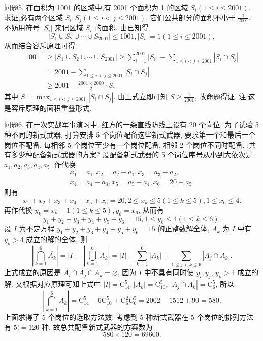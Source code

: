 问题5. 在面积为 1001 的区域中,有 2001 个面积为 1 的区域 $S_i(1 \leqslant i \leqslant 2001)$. 求证,必有两个区域 $S_i, S_j(1 \leqslant i<j \leqslant 2001)$, 它们公共部分的面积不小于 $\frac{1}{2001}$.
不妨用符号 $\left|S_i\right|$ 来记区域 $S_i$ 的面积.
由已知得
$$
\left|S_1 \cup S_2 \cup \cdots \cup S_{2001}\right| \leqslant 1001,\left|S_i\right|=1(1 \leqslant i \leqslant 2001),
$$
从而结合容斥原理可得
$$
\begin{aligned}
1001 & \geqslant\left|S_1 \cup S_2 \cup \cdots \cup S_{2001}\right| \geqslant \sum_{i=1}^{2001}\left|S_i\right|-\sum_{1 \leqslant i<j \leqslant 2001}\left|S_i \cap S_j\right| \\
& =2001-\sum_{1 \leqslant i<j \leqslant 2001}\left|S_i \cap S_j\right| \\
& \geqslant 2001-\frac{2001 \times 2000}{2} \cdot S,
\end{aligned}
$$
其中 $S=\max _{1 \leqslant i<j \leqslant 2001}\left|S_i \cap S_j\right|$.
由上式立即可知 $S \geqslant \frac{1}{2001}$, 故命题得证.
注:这是容斥原理的面积重叠形式.



问题6. 在一次实战军事演习中, 红方的一条直线防线上设有 20 个岗位.
为了试验 5 种不同的新式武器, 打算安排 5 个岗位配备这些新式武器, 要求第一个和最后一个岗位不配备, 每相邻 5 个岗位至少有一个岗位配备, 相邻 2
个岗位不同时配备.
:共有多少种配备新式武器的方案?
设配备新式武器的 5 个岗位序号从小到大依次是 $a_1, a_2, a_3, a_4, a_5$. 作代换
$$
\begin{gathered}
x_1=a_1, x_2=a_2-a_1, x_3=a_3-a_2, \\
x_4=a_4-a_3, x_5=a_5-a_4, x_6=20-a_5 .
\end{gathered}
$$
则有
$$
x_1+x_2+x_3+x_4+x_5+x_6=20,2 \leqslant x_k \leqslant 5(1 \leqslant k \leqslant 5), 1 \leqslant x_6 \leqslant 4 .
$$
再作代换 $y_k=x_k-1(1 \leqslant k \leqslant 5), y_6=x_6$, 从而有
$$
y_1+y_2+y_3+y_4+y_5+y_6=15,1 \leqslant y_k \leqslant 4(1 \leqslant k \leqslant 6) .
$$
设 $I$ 为不定方程 $y_1+y_2+y_3+y_4+y_5+y_6=15$ 的正整数解全体, $A_k$ 为 $I$ 中有 $y_k>4$ 成立的解的全体, 则
$$
\left|\bigcap_{k=1}^6 \overline{A_k}\right|=|I|-\left|\bigcup_{k=1}^6 A_k\right|=|I|-\sum_{k=1}^6\left|A_k\right|+\sum_{1 \leqslant j<k \leqslant 6}\left|A_j \cap A_k\right| .
$$
上式成立的原因是 $A_i \cap A_j \cap A_k=\varnothing$, 因为 $I$ 中不具有同时使 $y_i, y_j$, $y_k>4$ 成立的解.
又根据对应原理可知上式中 $|I|=\mathrm{C}_{14}^5,\left|A_k\right|=\mathrm{C}_{10}^5$, $\left|A_j \cap A_k\right|=\mathrm{C}_6^5$, 所以
$$
\left|\bigcap_{k=1}^6 \overline{A_k}\right|=\mathrm{C}_{14}^5-6 \mathrm{C}_{10}^5+\mathrm{C}_6^2 \mathrm{C}_6^5=2002-1512+90=580 .
$$
上面求得了 5 个岗位的选取方法数.
考虑到 5 种新式武器在 5 个岗位的排列方法有 $5 !=120$ 种, 故总共配备新式武器的方案数为
$$
580 \times 120=69600 .
$$



